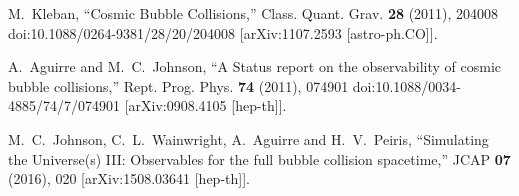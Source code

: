 \documentclass[a4paper,11pt]{article}
\numberwithin{equation}{section}
\begin{document}
\begin{thebibliography}{99}
M.~Kleban,
``Cosmic Bubble Collisions,''
Class. Quant. Grav. \textbf{28} (2011), 204008
doi:10.1088/0264-9381/28/20/204008
[arXiv:1107.2593 [astro-ph.CO]].

A.~Aguirre and M.~C.~Johnson,
``A Status report on the observability of cosmic bubble collisions,''
Rept. Prog. Phys. \textbf{74} (2011), 074901
doi:10.1088/0034-4885/74/7/074901
[arXiv:0908.4105 [hep-th]].


M.~C.~Johnson, C.~L.~Wainwright, A.~Aguirre and H.~V.~Peiris,
``Simulating the Universe(s) III: Observables for the full bubble collision spacetime,''
JCAP \textbf{07} (2016), 020
[arXiv:1508.03641 [hep-th]].





\end{thebibliography}
\end{document}
